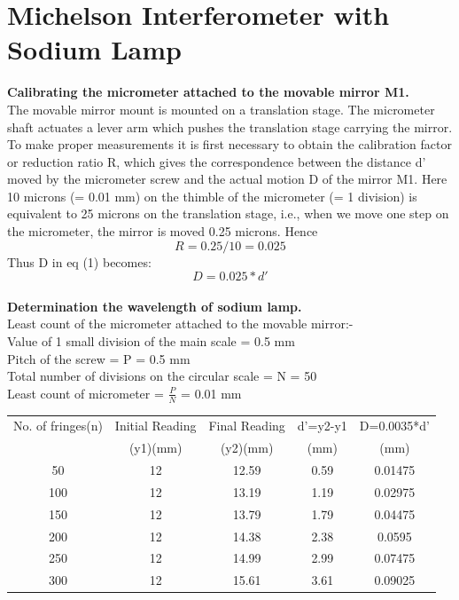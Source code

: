 \documentclass[12pt]{report}
\begin{document}
	\section{Michelson Interferometer with Sodium Lamp}
	\textbf{Calibrating the micrometer attached to the movable mirror M1.}\\
	The movable mirror mount is mounted on a translation stage. The micrometer shaft
	actuates a lever arm which pushes the translation stage carrying the mirror. To make
	proper measurements it is first necessary to obtain the calibration factor or reduction ratio
	R, which gives the correspondence between the distance d’ moved by the micrometer
	screw and the actual motion D of the mirror M1.
	Here 10 microns (= 0.01 mm) on the thimble of the micrometer (= 1 division) is equivalent
	to 25 microns on the translation stage, i.e., when we move one step on the micrometer, the
	mirror is moved 0.25 microns. Hence
	$$R=0.25/10=0.025$$
	Thus D in eq (1) becomes:
	$$D=0.025*d'$$\\
	\textbf{Determination the wavelength of sodium lamp.}\\
	Least count of the micrometer attached to the movable mirror:-\\
	Value of 1 small division of the main scale = 0.5 mm\\
	Pitch of the screw = P = 0.5 mm\\
	Total number of divisions on the circular scale = N = 50\\
	Least count of micrometer = $\frac{P}{N}$ = 0.01 mm\\
	\begin{center}
		\begin{tabular}{|c|c|c|c|c|}
			\hline
			No. of fringes(n) & Initial Reading & Final Reading & d'=y2-y1 & D=0.0035*d'\\
			& (y1)(mm) & (y2)(mm) & (mm)   & (mm)   \\ \hline
			50  & 12 & 12.59 & 0.59 & 0.01475 \\
			100 & 12 & 13.19 & 1.19 & 0.02975 \\
			150 & 12 & 13.79 & 1.79 & 0.04475 \\
			200 & 12 & 14.38 & 2.38 & 0.0595  \\
			250 & 12 & 14.99 & 2.99 & 0.07475 \\
			300 & 12 & 15.61 & 3.61 & 0.09025 \\
			\hline
		\end{tabular}
		\\
	\end{center}
\end{document}
